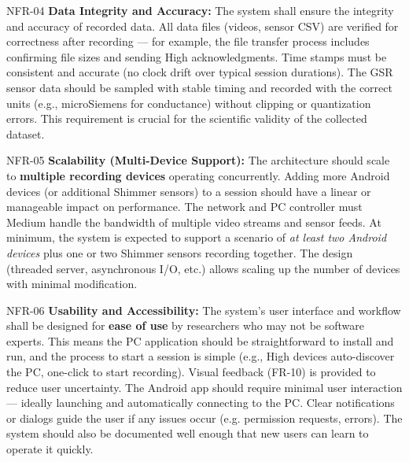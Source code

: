 \documentclass[11pt,a4paper]{report}
\begin{document}
  NFR-04 \textbf{Data Integrity and Accuracy:} The system shall ensure the integrity
  and accuracy of recorded data.  All data files (videos, sensor CSV) are verified
  for correctness after recording --- for example, the file transfer process includes
  confirming file sizes and sending High
                          acknowledgments\cite{Healey2005}.  Time stamps must be
                          consistent and accurate (no clock drift over typical
                          session durations).  The GSR sensor data should be sampled
                          with
                          stable timing and recorded with the correct units (e.g.,
                          microSiemens for conductance) without clipping or
                          quantization errors.  This requirement is crucial for the
                          scientific validity of the collected dataset.

  NFR-05 \textbf{Scalability (Multi-Device Support):} The architecture should scale
  to \textbf{multiple recording devices} operating concurrently.  Adding more Android
  devices (or additional Shimmer sensors) to a session should have a linear or
  manageable impact on performance.  The network and PC controller must Medium
                          handle the bandwidth of multiple video streams and sensor
                          feeds.  At minimum, the system is expected to support a
                          scenario of \textit{at least two Android devices} plus one
                          or two Shimmer sensors recording together.  The design
                          (threaded server, asynchronous I/O, etc.) allows scaling up
                          the number of
                          devices with minimal
                          modification\cite{GSRPPGMachineLearning2024}.

  NFR-06 \textbf{Usability and Accessibility:} The system's user interface and
  workflow shall be designed for \textbf{ease of use} by researchers who may not be
  software experts.  This means the PC application should be straightforward to
  install and run, and the process to start a session is simple (e.g., High
                          devices auto-discover the PC, one-click to start recording).
                          Visual feedback (FR-10) is provided to reduce user
                          uncertainty.  The Android app should require minimal user
                          interaction --- ideally launching and automatically
                          connecting to the PC.  Clear notifications or dialogs guide
                          the user if
                          any issues occur (e.g.  permission requests, errors).  The
                          system should also be documented well enough that new users
                          can learn to operate it quickly.
\end{document}
